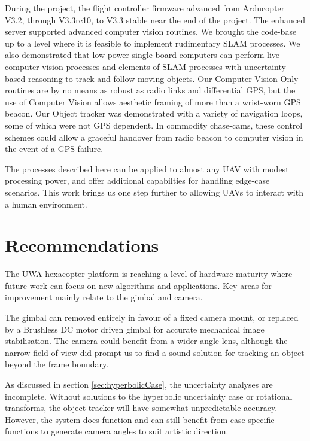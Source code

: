 \documentclass{article}
\begin{document}
During the project, the flight controller firmware advanced from Arducopter V3.2, through V3.3rc10, to V3.3 stable near the end of the project.
The enhanced server supported advanced computer vision routines.
We brought the code-base up to a level where it is feasible to implement rudimentary SLAM processes. We also demonstrated that low-power single board computers can perform live computer vision processes and elements of SLAM processes with uncertainty based reasoning to track and follow moving objects. Our Computer-Vision-Only routines are by no means as robust as radio links and differential GPS, but the use of Computer Vision allows aesthetic framing of more than a wrist-worn GPS beacon. Our Object tracker was demonstrated with a variety of navigation loops, some of which were not GPS dependent. In commodity chase-cams, these control schemes could allow a graceful handover from radio beacon to computer vision in the event of a GPS failure.

The processes described here can be applied to almost any UAV with modest processing power, and offer additional capabilties for handling edge-case scenarios.
This work brings us one step further to allowing UAVs to interact with a human environment.



\section{Recommendations}

  The UWA hexacopter platform is reaching a level of hardware maturity where future work can focus on new algorithms and applications.  Key areas for improvement mainly relate to the gimbal and camera.

  The gimbal can removed entirely in favour of a fixed camera mount, or replaced by a Brushless DC motor driven gimbal for accurate mechanical image stabilisation.  The camera could benefit from a wider angle lens, although the narrow field of view did prompt us to find a sound solution for tracking an object beyond the frame boundary.

  As discussed in section \ref{sec:hyperbolicCase}, the uncertainty analyses are incomplete.
  Without solutions to the hyperbolic uncertainty case or rotational transforms, the object tracker will have somewhat unpredictable accuracy.  However, the system does function and can still benefit from case-specific functions to generate camera angles to suit artistic direction.
\end{document}

